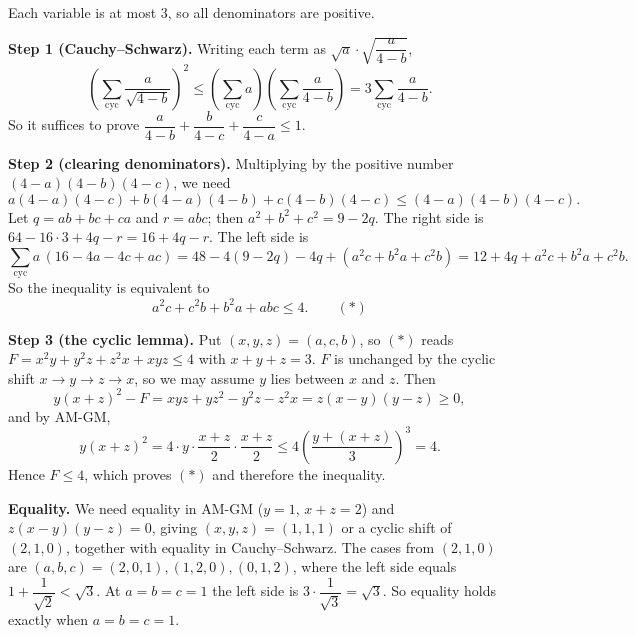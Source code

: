 Each variable is at most $3$, so all denominators are positive.

\textbf{Step 1 (Cauchy--Schwarz).} Writing each term as $\sqrt a\cdot\sqrt{\dfrac{a}{4-b}}$,
\[
\left(\sum_{\text{cyc}}\dfrac{a}{\sqrt{4-b}}\right)^2\le\left(\sum_{\text{cyc}} a\right)\left(\sum_{\text{cyc}}\dfrac{a}{4-b}\right)=3\sum_{\text{cyc}}\dfrac{a}{4-b}.
\]
So it suffices to prove $\dfrac{a}{4-b}+\dfrac{b}{4-c}+\dfrac{c}{4-a}\le1$.

\textbf{Step 2 (clearing denominators).} Multiplying by the positive number $(4-a)(4-b)(4-c)$, we need
\[
a(4-a)(4-c)+b(4-a)(4-b)+c(4-b)(4-c)\le(4-a)(4-b)(4-c).
\]
Let $q=ab+bc+ca$ and $r=abc$; then $a^2+b^2+c^2=9-2q$. The right side is $64-16\cdot3+4q-r=16+4q-r$. The left side is
\[
\sum_{\text{cyc}}a\,(16-4a-4c+ac)=48-4(9-2q)-4q+\left(a^2c+b^2a+c^2b\right)=12+4q+a^2c+b^2a+c^2b .
\]
So the inequality is equivalent to
\[
a^2c+c^2b+b^2a+abc\le4. \qquad (\ast)
\]

\textbf{Step 3 (the cyclic lemma).} Put $(x,y,z)=(a,c,b)$, so $(\ast)$ reads $F=x^2y+y^2z+z^2x+xyz\le4$ with $x+y+z=3$. $F$ is unchanged by the cyclic shift $x\to y\to z\to x$, so we may assume $y$ lies between $x$ and $z$. Then
\[
y(x+z)^2-F=xyz+yz^2-y^2z-z^2x=z(x-y)(y-z)\ge0,
\]
and by AM-GM,
\[
y(x+z)^2=4\cdot y\cdot\dfrac{x+z}{2}\cdot\dfrac{x+z}{2}\le4\left(\dfrac{y+(x+z)}{3}\right)^3=4 .
\]
Hence $F\le4$, which proves $(\ast)$ and therefore the inequality.

\textbf{Equality.} We need equality in AM-GM ($y=1$, $x+z=2$) and $z(x-y)(y-z)=0$, giving $(x,y,z)=(1,1,1)$ or a cyclic shift of $(2,1,0)$, together with equality in Cauchy--Schwarz. The cases from $(2,1,0)$ are $(a,b,c)=(2,0,1),(1,2,0),(0,1,2)$, where the left side equals $1+\dfrac{1}{\sqrt2}<\sqrt3$. At $a=b=c=1$ the left side is $3\cdot\dfrac{1}{\sqrt3}=\sqrt3$. So equality holds exactly when $\boxed{a=b=c=1}$.
